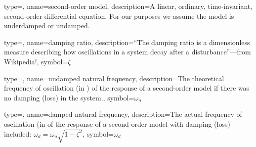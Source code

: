 {
type=\thisgls,
name={second-order model},
description={A linear, ordinary, time-invariant, second-order differential equation.  For our purposes we assume the model is underdamped or undamped.}
}

{
type=\thisgls,
name={damping ratio},
description={``The damping ratio is a dimensionless measure describing how oscillations in a system decay after a disturbance''---from Wikipedia!},
symbol={$\zeta$}
}

{
type=\thisgls,
name={undamped natural frequency},
description={The theoretical frequency of oscillation (in ) of the response of a second-order model if there was no damping (loss) in the system.},
symbol={$\omega_n$}
}

{
type=\thisgls,
name={damped natural frequency},
description={The actual frequency of oscillation (in  of the response of a second-order model with damping (loss) included: $\omega_d = \omega_n \sqrt{1-\zeta^2}$},
symbol={$\omega_d$}
}
